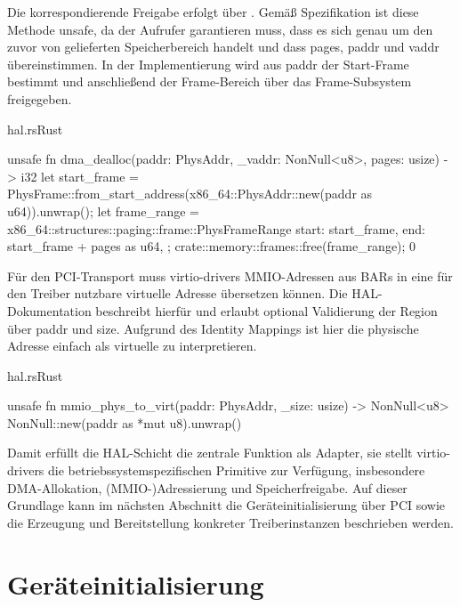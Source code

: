 Die korrespondierende Freigabe erfolgt über . Gemäß Spezifikation ist diese Methode unsafe, da der Aufrufer garantieren muss, dass es sich genau um den zuvor von  gelieferten Speicherbereich handelt und dass pages, paddr und vaddr übereinstimmen. In der Implementierung wird aus paddr der Start-Frame bestimmt und anschließend der Frame-Bereich über das Frame-Subsystem freigegeben.

\begin{codeblock}{hal.rs}{Rust}
  \begin{rustcode}
unsafe fn dma_dealloc(paddr: PhysAddr, _vaddr: NonNull<u8>, pages: usize) -> i32 {
    let start_frame =
        PhysFrame::from_start_address(x86_64::PhysAddr::new(paddr as u64)).unwrap();
    let frame_range = x86_64::structures::paging::frame::PhysFrameRange {
        start: start_frame,
        end: start_frame + pages as u64,
    };
    crate::memory::frames::free(frame_range);
    0
}
  \end{rustcode}
\end{codeblock}

Für den PCI-Transport muss virtio-drivers MMIO-Adressen aus BARs in eine für den Treiber nutzbare virtuelle Adresse übersetzen können. Die HAL-Dokumentation beschreibt hierfür  und erlaubt optional Validierung der Region über paddr und size. Aufgrund des Identity Mappings ist hier die physische Adresse einfach als virtuelle zu interpretieren.

\begin{codeblock}{hal.rs}{Rust}
  \begin{rustcode}
unsafe fn mmio_phys_to_virt(paddr: PhysAddr, _size: usize) -> NonNull<u8> {
    NonNull::new(paddr as *mut u8).unwrap()
}
  \end{rustcode}
\end{codeblock}

Damit erfüllt die HAL-Schicht die zentrale Funktion als Adapter, sie stellt virtio-drivers die betriebssystemspezifischen Primitive zur Verfügung, insbesondere DMA-Allokation, (MMIO-)Adressierung und Speicherfreigabe. Auf dieser Grundlage kann im nächsten Abschnitt die Geräteinitialisierung über PCI sowie die Erzeugung und Bereitstellung konkreter Treiberinstanzen beschrieben werden.


\section{Geräteinitialisierung}

